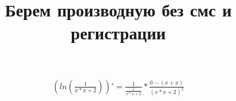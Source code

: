 \documentclass{article}
\title{Берем производную без смс и регистрации}
\begin{document}
\maketitle
\begin{eqnarray}
\left( ln\left(\frac{{1}}{{{{x}*{x}}+{2}}}\right)\right) ' = 
{\frac{{1}}{\frac{{1}}{{{{x}*{x}}+{2}}}}*\frac{{{0}}-\left({{{x}+{x}}}\right)}{{\left({{{x}*{x}}+{2}}\right)}^{{2}}}}\end{eqnarray}
\end{document}
